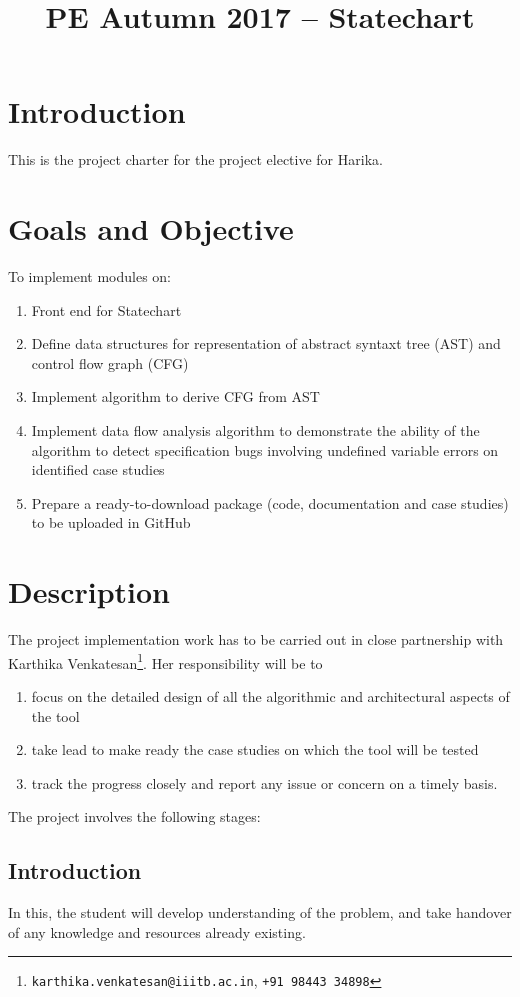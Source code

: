 \documentclass[12pt, a4paper]{article}
\title{PE Autumn 2017 -- Statechart}
\begin{document}
\maketitle

\section{Introduction}
This is the project charter for the project elective for Harika.

\section{Goals and Objective}
To implement modules on:
\begin{enumerate}
	\item Front end for Statechart
	\item Define data structures for representation of abstract syntaxt tree (AST) and control flow graph (CFG)
	\item Implement algorithm to derive CFG from AST
	\item Implement data flow analysis algorithm to demonstrate the ability of the algorithm to detect specification bugs involving undefined variable errors on identified case studies
	\item Prepare a ready-to-download package (code, documentation and case studies) to be uploaded in GitHub
\end{enumerate}

\section{Description}
The project implementation work has to be carried out in close partnership with Karthika Venkatesan\footnote{\texttt{karthika.venkatesan@iiitb.ac.in}, \texttt{+91 98443 34898}}. Her responsibility will be to
\begin{enumerate}
	\item focus on the detailed design of all the algorithmic and architectural aspects of the tool
	\item take lead to make ready the case studies on which the tool will be tested
	\item track the progress closely and report any issue or concern on a timely basis.
\end{enumerate}

The project involves the following stages:
\subsection{Introduction}
In this, the student will develop understanding of the problem, and take handover of any knowledge and resources already existing.
\end{document}
